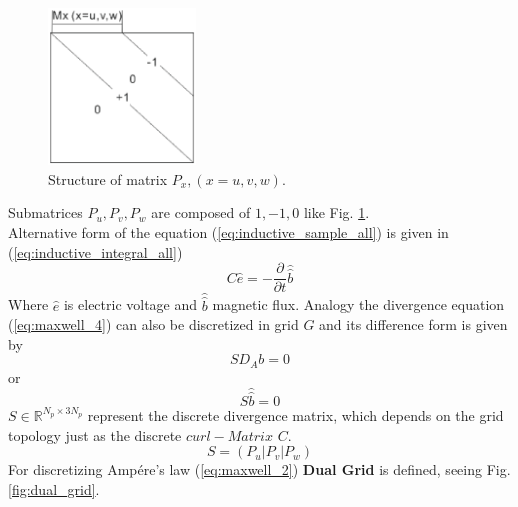 \begin{figure}[!ht]
\centering
\includegraphics[width=0.35\textwidth]{bilder/P_matrix}
\caption{Structure of matrix $P_{x},(x=u,v,w)$.}
\label{fig:Matrix Px}
\end{figure}
Submatrices $P_{u},P_{v},P_{w}$ are composed of $1,-1,0$ like Fig. \ref{fig:Matrix Px}.\\
 
Alternative form of the equation (\ref{eq:inductive_sample_all}) is given in (\ref{eq:inductive_integral_all})
\begin{equation}
C\widehat{e}=-\frac{\partial}{\partial{t}}\widehat{\widehat{b}}
\label{eq:inductive_integral_all}
\end{equation}
Where $\widehat{e}$ is electric voltage and $\widehat{\widehat{b}}$ magnetic flux.
Analogy the divergence equation (\ref{eq:maxwell_4}) can also be discretized in grid $G$ and its difference form is given by 
\begin{equation*}
SD_{A}b=0
\label{eq:divergence_sample}
\end{equation*}
or
\begin{equation*}
S\widehat{\widehat{b}}=0
\label{eq:divergence_integral}
\end{equation*}
$S\in \mathbb{R}^{N_{p}\times 3N_{p}}$ represent the discrete divergence matrix, which depends on the grid topology just as the discrete $curl-Matrix$ $C$.
\begin{equation*}
S=(P_{u}|P_{v}|P_{w})
\label{eq:S_matrix}
\end{equation*}
For discretizing Amp\'ere's law (\ref{eq:maxwell_2}) \textbf{Dual Grid} is defined, seeing Fig. \ref{fig:dual_grid}. 

